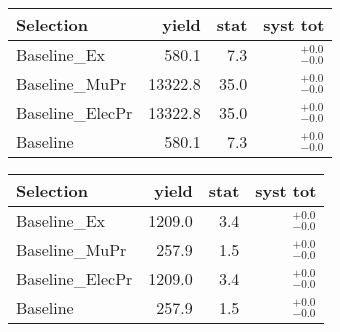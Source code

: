 
\begin{tabular}{l|rrr}
\toprule
          Selection & yield & stat & syst tot   \\ 
\midrule
       Baseline\_Ex & 580.1 & 7.3 & ${}^{+0.0}_{-0.0}$ \\
     Baseline\_MuPr & 13322.8 & 35.0 & ${}^{+0.0}_{-0.0}$ \\
   Baseline\_ElecPr & 13322.8 & 35.0 & ${}^{+0.0}_{-0.0}$ \\
           Baseline & 580.1 & 7.3 & ${}^{+0.0}_{-0.0}$ \\
\bottomrule
\end{tabular}



\begin{tabular}{l|rrr}
\toprule
          Selection & yield & stat & syst tot   \\ 
\midrule
       Baseline\_Ex & 1209.0 & 3.4 & ${}^{+0.0}_{-0.0}$ \\
     Baseline\_MuPr & 257.9 & 1.5 & ${}^{+0.0}_{-0.0}$ \\
   Baseline\_ElecPr & 1209.0 & 3.4 & ${}^{+0.0}_{-0.0}$ \\
           Baseline & 257.9 & 1.5 & ${}^{+0.0}_{-0.0}$ \\
\bottomrule
\end{tabular}
